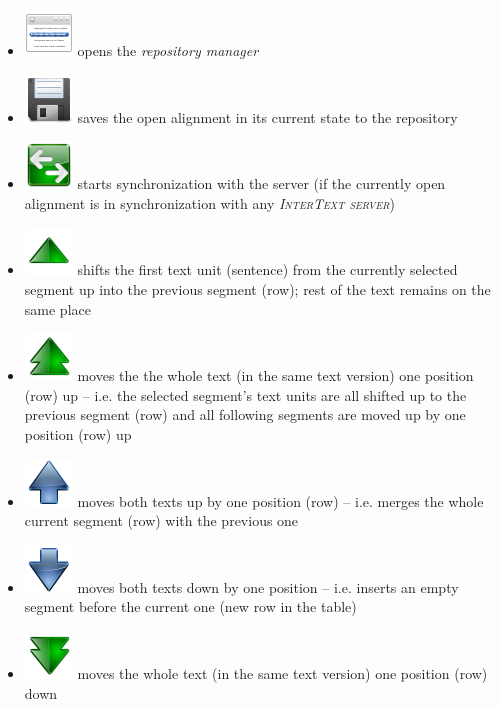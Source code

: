 \documentclass[a4paper,10pt,oneside]{book}
\newcommand{\ITserver}{\textit{\textsc{InterText server}}\xspace}
\begin{document}
\begin{itemize}
	\item \includegraphics[height=2ex]{../images/48/manager.png} opens the \emph{repository manager}
	\item \includegraphics[height=2ex]{../images/48/document-save.png} saves the open alignment in its current state to the repository
	\item \includegraphics[height=2ex]{../images/48/synchronize.png} starts synchronization with the server (if the currently open alignment is in synchronization with any \ITserver)
	\item \includegraphics[height=2ex]{../images/48/arrow-up.png} shifts the first text unit (sentence) from the currently selected segment up into the previous segment (row); rest of the text remains on the same place
	\item \includegraphics[height=2ex]{../images/48/arrow-up-double.png} moves the the whole text (in the same text version) one position (row) up -- i.e. the selected segment's text units are all shifted up to the previous segment (row) and all following segments are moved up by one position (row) up
	\item \includegraphics[height=2ex]{../images/48/go-up.png} moves both texts up by one position (row) -- i.e. merges the whole current segment (row) with the previous one
	\item \includegraphics[height=2ex]{../images/48/go-down.png} moves both texts down by one position -- i.e. inserts an empty segment before the current one (new row in the table)
	\item \includegraphics[height=2ex]{../images/48/arrow-down-double.png} moves the whole text (in the same text version) one position (row) down

\end{itemize}
\end{document}
